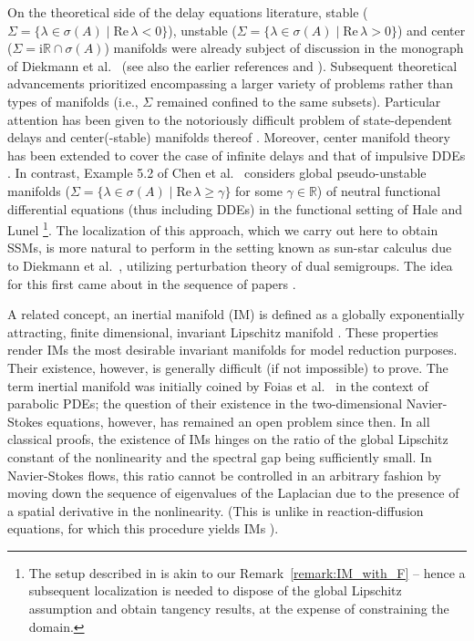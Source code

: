 \documentclass[a4paper, 12pt, oneside, reqno, notitlepage]{amsart}
\theoremstyle{plain}
\theoremstyle{definition}
\theoremstyle{remark}
\begin{document}
On the theoretical side of the delay equations literature, stable ($ \Sigma = \{ \lambda \in \sigma(A) \; | \; \mathrm{Re } \, \lambda < 0\}$), unstable ($\Sigma = \{\lambda \in \sigma(A) \; | \; \mathrm{Re } \, \lambda > 0\}$) and center ($ \Sigma =\mathrm{i} \mathbb{R} \cap \sigma(A)$)  manifolds were already subject of discussion in the monograph of Diekmann et al.~\cite{diekmann2012delay} (see also the earlier references \cite{hale1964neighborhood} and \cite{diekmann1984invariant}).
Subsequent theoretical advancements prioritized encompassing a larger variety of problems rather than types of manifolds (i.e., $\Sigma$ remained confined to the same subsets).
Particular attention has been given to the notoriously difficult problem of state-dependent delays \cite{hartung2006functional} and center(-stable) manifolds thereof \cite{krisztin2006c1,qesmi2009center}.
Moreover, center manifold theory has been extended to cover the case of infinite delays \cite{matsunaga2015center} and that of impulsive DDEs \cite{church2018smooth}.
In contrast,
Example 5.2 of
Chen et al.~\cite{chen1997invariant} considers global pseudo-unstable manifolds ($ \Sigma = \{\lambda \in \sigma(A) \; | \; \mathrm{Re } \, \lambda \geq \gamma\}$ for some $\gamma \in \mathbb{R}$) of neutral functional differential equations (thus including DDEs) in the functional setting of Hale and Lunel \cite{hale2013introduction}\footnote{The setup described in \cite{chen1997invariant} is akin to our Remark~\ref{remark:IM_with_F} -- hence a subsequent localization is needed to dispose of the global Lipschitz assumption and obtain tangency results, at the expense of constraining the domain. 
}. 
The localization of this approach, which we carry out here to obtain SSMs, is more natural to perform in the setting known as sun-star calculus due to Diekmann et al.~\cite{diekmann2012delay}, utilizing perturbation theory of dual semigroups.
The idea for this first came about in the sequence of papers
\cite{diekmann1987perturbed,clement1987perturbation,clement1988perturbation,clement1989perturbation,clement2020perturbation,diekmann2023perturbation}.


A related concept, an inertial manifold (IM) 
is defined as a globally exponentially attracting, finite dimensional, invariant Lipschitz manifold \cite{foias1988inertial,constantin2012integral,TITI1990}. 
These properties render IMs the most desirable invariant manifolds for model reduction purposes.
Their existence, however, is generally difficult (if not impossible) to prove. 
The term inertial manifold was initially coined by Foias et al.~\cite{foias1988inertial} in the context of parabolic PDEs; the question of their existence in the two-dimensional Navier-Stokes equations, however, has remained an open problem since then.
In all classical proofs, the existence of IMs hinges on the ratio of the global Lipschitz constant of the nonlinearity and the spectral gap being sufficiently small. 
In Navier-Stokes flows, this ratio cannot be controlled in an arbitrary fashion by moving down the sequence of eigenvalues of the Laplacian due to the presence of a spatial derivative in the nonlinearity. (This is unlike in  reaction-diffusion equations, for which this procedure yields IMs \cite{robinson2001}).
\end{document}
